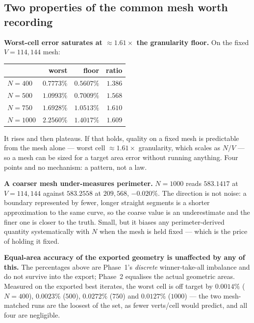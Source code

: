\documentclass[11pt,a4paper]{article}
\begin{document}
\subsection*{Two properties of the common mesh worth recording}

\textbf{Worst-cell error saturates at \(\approx 1.61\times\) the granularity
floor.} On the fixed \(V{=}114{,}144\) mesh:

\begin{center}\small
\begin{tabular}{@{}lrrr@{}}
\toprule
 & worst & floor & ratio \\
\midrule
\(N{=}400\)  & \(0.7773\%\) & \(0.5607\%\) & \(1.386\) \\
\(N{=}500\)  & \(1.0993\%\) & \(0.7009\%\) & \(1.568\) \\
\(N{=}750\)  & \(1.6928\%\) & \(1.0513\%\) & \(\mathbf{1.610}\) \\
\(N{=}1000\) & \(2.2560\%\) & \(1.4017\%\) & \(\mathbf{1.609}\) \\
\bottomrule
\end{tabular}
\end{center}

It rises and then plateaus. If that holds, quality on a fixed mesh is predictable
from the mesh alone --- worst cell \(\approx 1.61 \times\) granularity, which
scales as \(N/V\) --- so a mesh can be sized for a target area error without
running anything. Four points and no mechanism: a pattern, not a law.

\textbf{A coarser mesh under-measures perimeter.} \(N{=}1000\) reads
\(583.1417\) at \(V{=}114{,}144\) against \(583.2558\) at \(209{,}568\),
\(-0.020\%\). The direction is not noise: a boundary represented by fewer, longer
straight segments is a shorter approximation to the same curve, so the coarse
value is an underestimate and the finer one is closer to the truth. Small, but it
biases any perimeter-derived quantity systematically with \(N\) when the mesh is
held fixed --- which is the price of holding it fixed.

\textbf{Equal-area accuracy of the exported geometry is unaffected by any of
this.} The percentages above are Phase~1's \emph{discrete} winner-take-all
imbalance and do not survive into the export; Phase~2 equalises the actual
geometric areas. Measured on the exported best iterates, the worst cell is off
target by \(0.0014\%\) (\(N{=}400\)), \(0.0023\%\) (\(500\)), \(0.0272\%\)
(\(750\)) and \(0.0127\%\) (\(1000\)) --- the two mesh-matched runs are the
loosest of the set, as fewer verts/cell would predict, and all four are
negligible.
\end{document}
